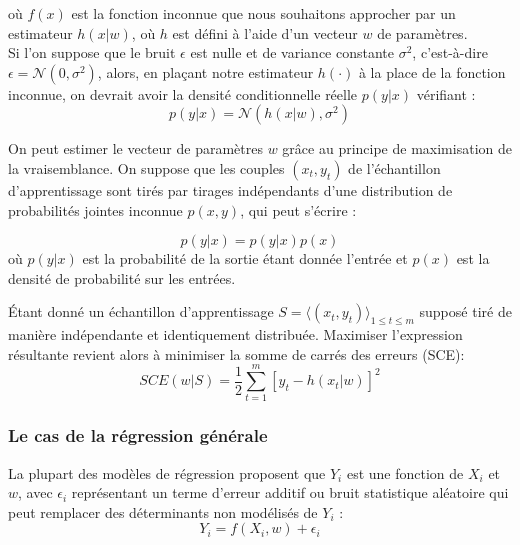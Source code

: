 		où $f(x)$ est la fonction inconnue que nous souhaitons approcher par un estimateur $h(x|w)$, où $h$ est défini à l'aide d'un vecteur $w$ de paramètres.\\
		Si l'on suppose que le bruit $\epsilon$ est nulle et de variance constante $\sigma^2$, c'est-à-dire $ \epsilon = \mathcal{N}(0,\sigma^2)$, alors, en plaçant notre estimateur $h(\cdot)$ à la place de la fonction inconnue, on devrait avoir la densité conditionnelle réelle $p(y|x)$ vérifiant :
		\begin{equation}
			p(y|x) = \mathcal{N}(h(x|w),\sigma^2)
		\end{equation}
		
		On peut estimer le vecteur de paramètres $w$ grâce au principe de maximisation de la vraisemblance. On suppose que les couples $(x_t, y_t)$ de l'échantillon d'apprentissage sont tirés par tirages indépendants d'une distribution de probabilités jointes inconnue $p(x, y)$, qui peut s'écrire :
		
		$$
			p(y|x) = p(y|x)p(x)
		$$
		où $p(y|x)$ est la probabilité de la sortie étant donnée l'entrée et $p(x)$ est la densité de probabilité sur les entrées.\cite{matloff2017statistical}
		
		Étant donné un échantillon d'apprentissage $S = \langle (x_t,y_t) \rangle_{1\leq t\leq m} $ supposé tiré de manière indépendante et identiquement distribuée.
		Maximiser l'expression résultante revient alors à minimiser la somme de carrés des erreurs (SCE):
		\begin{equation}\label{eq:sce_1}
			SCE(w|\mathit{S}) = \frac{1}{2} \sum_{{t=1}}^{m}{ [ y_t - h(x_t|w) ]^2}	
		\end{equation}
		
	\subsubsection{Le cas de la régression générale}
		La plupart des modèles de régression proposent que $Y_{i}$ est une fonction de $X_{i}$ et $w$, avec $\epsilon_{i}$ représentant un terme d'erreur additif ou bruit statistique aléatoire qui peut remplacer des déterminants non modélisés de $Y_{i}$ :
		\begin{equation}
			{\displaystyle Y_{i}=f(X_{i},w )+\epsilon_{i}}
		\end{equation}
	
